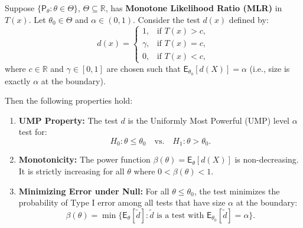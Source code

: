 \begin{theo}
\label{thm:ump_mlr}
Suppose $\{\mathsf{P}_{\theta}: \theta \in \Theta\}$, $\Theta \subseteq \mathbb{R}$, has \textbf{Monotone Likelihood Ratio (MLR)} in $T(x)$. Let $\theta_0 \in \Theta$ and $\alpha \in (0,1)$.
Consider the test $d(x)$ defined by:
\[
d(x) = \begin{cases} 
1, & \text{if } T(x) > c, \\ 
\gamma, & \text{if } T(x) = c, \\ 
0, & \text{if } T(x) < c, 
\end{cases}
\]
where $c \in \mathbb{R}$ and $\gamma \in [0,1]$ are chosen such that $\mathsf{E}_{\theta_0}[d(X)] = \alpha$ (i.e., size is exactly $\alpha$ at the boundary).

Then the following properties hold:

\begin{enumerate}[label=\roman*)]
    \item \textbf{UMP Property:} The test $d$ is the Uniformly Most Powerful (UMP) level $\alpha$ test for:
    \[ H_0: \theta \leq \theta_0 \quad \text{vs.} \quad H_1: \theta > \theta_0. \]
    
    \item \textbf{Monotonicity:} The power function $\beta(\theta) = \mathsf{E}_{\theta}[d(X)]$ is non-decreasing. It is strictly increasing for all $\theta$ where $0 < \beta(\theta) < 1$.
    
    \item \textbf{Minimizing Error under Null:} For all $\theta \le \theta_0$, the test minimizes the probability of Type I error among all tests that have size $\alpha$ at the boundary:
    \[ \beta(\theta) = \min \{ \mathsf{E}_{\theta}[\tilde{d}] : \tilde{d} \text{ is a test with } \mathsf{E}_{\theta_0}[\tilde{d}] = \alpha \}. \]
\end{enumerate}
\end{theo}

